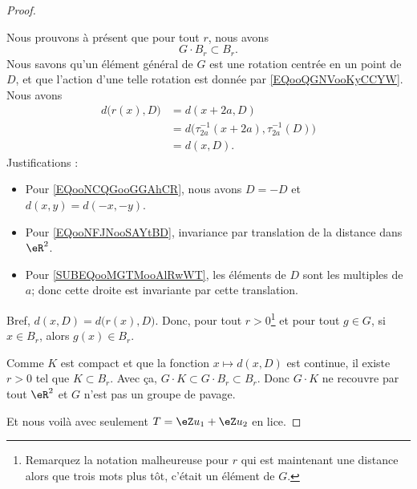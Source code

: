 \begin{proof}
\begin{subproof}
\begin{subproof}
			Nous prouvons à présent que pour tout \( r\), nous avons
			\begin{equation}
				G\cdot B_r \subset B_r.
			\end{equation}
			Nous savons qu'un élément général de \( G\) est une rotation centrée en un point de \( D\), et que l'action d'une telle rotation est donnée par \eqref{EQooQGNVooKyCCYW}. Nous avons
			\begin{subequations}
				\begin{align}
					d\big( r(x),D \big) & =d(x+2a,D)      \label{EQooNCQGooGGAhCR}                                        \\
					                    & =d\big( \tau_{2a}^{-1}(x+2a),\tau_{2a}^{-1}(D) \big)   \label{EQooNFJNooSAYtBD} \\
					                    & =d(x,D)        \label{SUBEQooMGTMooAlRwWT}.
				\end{align}
			\end{subequations}
			Justifications :
			\begin{itemize}
				\item Pour \eqref{EQooNCQGooGGAhCR}, nous avons \( D=-D\) et \(d(x,y)=d(-x,-y) \).
				\item Pour \eqref{EQooNFJNooSAYtBD}, invariance par translation de la distance dans \( \eR^2\).
				\item Pour \eqref{SUBEQooMGTMooAlRwWT}, les éléments de \( D\) sont les multiples de \( a\); donc cette droite est invariante par cette translation.
			\end{itemize}
			Bref, \( d(x,D)=d\big( r(x),D \big) \). Donc, pour tout \( r>0\)\footnote{Remarquez la notation malheureuse pour \( r\) qui est maintenant une distance alors que trois mots plus tôt, c'était un élément de \( G\).} et pour tout \( g\in G\), si \( x\in B_r\), alors \( g(x)\in B_r\).

			\spitem[Exclusion]

			Comme \( K\) est compact et que la fonction \( x\mapsto d(x,D)\) est continue, il existe \( r>0\) tel que \( K\subset B_r\). Avec ça, \( G\cdot K\subset G\cdot B_r\subset B_r\). Donc \( G\cdot K\) ne recouvre par tout \( \eR^2\) et \( G\) n'est pas un groupe de pavage.
		\end{subproof}
	\end{subproof}

	Et nous voilà avec seulement \( T=\eZ u_1+\eZ u_2\) en lice.


\end{proof}
